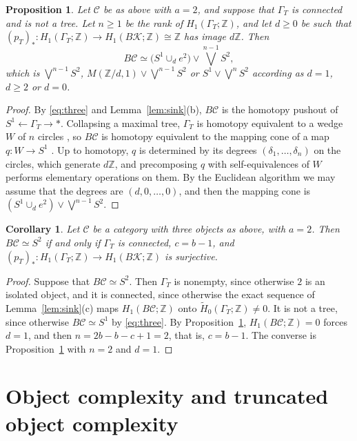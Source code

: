 \documentclass[12pt]{amsart}
\newtheorem{proposition}[teo]{Proposition}
\newtheorem{corollary}[teo]{Corollary}
\theoremstyle{definition}
\theoremstyle{remark}
\newcommand{\CC}{\mathcal{C}}
\newcommand{\co}{\colon}
\newcommand{\Z}{\mathbb{Z}}
\newcommand{\K}{\mathcal{K}}
\newcommand{\M}{M}
\begin{document}
\begin{proposition}\label{prop:three}
Let $\CC$ be as above with $a=2$, and suppose that $\Gamma_T$ is connected and is not a tree. Let $n\ge1$ be the rank of $H_1(\Gamma_T;\Z)$, and let $d\ge0$ be such that $(p_T)_*\co H_1(\Gamma_T;\Z)\to H_1(B\K;\Z)\cong\Z$ has image $d\Z$. Then
\[
B\CC\simeq\bigl(S^1\cup_de^2\bigr)\vee\bigvee^{n-1}S^2,
\]
which is $\bigvee^{n-1}S^2$, $\M(\Z/d,1)\vee\bigvee^{n-1}S^2$ or $S^1\vee\bigvee^nS^2$ according as $d=1$, $d\ge2$ or $d=0$.
\end{proposition}

\begin{proof}
By \eqref{eq:three} and Lemma~\ref{lem:sink}(b), $B\CC$ is the homotopy pushout of $S^1\leftarrow\Gamma_T\to*$. Collapsing a maximal tree, $\Gamma_T$ is homotopy equivalent to a wedge $W$ of $n$ circles \cite[Proposition~0.17]{Hatcher2002}, so $B\CC$ is homotopy equivalent to the mapping cone of a map $q\co W\to S^1$ \cite[Proposition~0.18 and Section~4.G]{Hatcher2002}. Up to homotopy, $q$ is determined by its degrees $(\delta_1,\dots,\delta_n)$ on the circles, which generate $d\Z$, and precomposing $q$ with self-equivalences of $W$ performs elementary operations on them. By the Euclidean algorithm we may assume that the degrees are $(d,0,\dots,0)$, and then the mapping cone is $(S^1\cup_de^2)\vee\bigvee^{n-1}S^2$.
\end{proof}

\begin{corollary}\label{cor:three-S2}
Let $\CC$ be a category with three objects as above, with $a=2$. Then $B\CC\simeq S^2$ if and only if $\Gamma_T$ is connected, $c=b-1$, and $(p_T)_*\co H_1(\Gamma_T;\Z)\to H_1(B\K;\Z)$ is surjective.
\end{corollary}

\begin{proof}
Suppose that $B\CC\simeq S^2$. Then $\Gamma_T$ is nonempty, since otherwise $2$ is an isolated object, and it is connected, since otherwise the exact sequence of Lemma~\ref{lem:sink}(c) maps $H_1(B\CC;\Z)$ onto $\widetilde H_0(\Gamma_T;\Z)\neq0$. It is not a tree, since otherwise $B\CC\simeq S^1$ by \eqref{eq:three}. By Proposition~\ref{prop:three}, $H_1(B\CC;\Z)=0$ forces $d=1$, and then $n=2b-b-c+1=2$, that is, $c=b-1$. The converse is Proposition~\ref{prop:three} with $n=2$ and $d=1$.
\end{proof}

\section{Object complexity and truncated object complexity}\label{sec:bounds}
\end{document}
